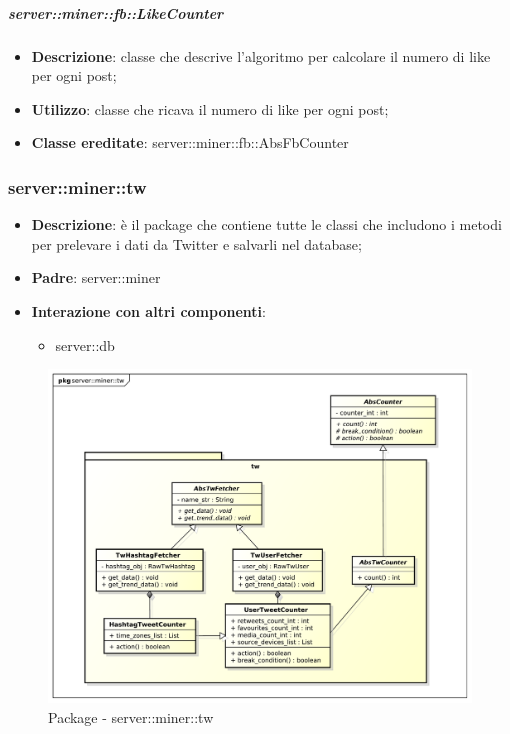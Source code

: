 	\subparagraph{server::miner::fb::LikeCounter} %
		\label{subp:server_miner_fb_LikeCounter}
			\begin{itemize}
				\item \textbf{Descrizione}: classe che descrive l'algoritmo per calcolare il numero di like per ogni post;
				\item \textbf{Utilizzo}: classe che ricava il numero di like per ogni post;
				\item \textbf{Classe ereditate}: server::miner::fb::AbsFbCounter
			\end{itemize}

\subsubsection{server::miner::tw} %
\label{ssub:bdsm_app_server_miner_tw}

\begin{itemize}
  \item \textbf{Descrizione}: è il package che contiene tutte le classi che includono i metodi per prelevare i dati da Twitter e salvarli nel database;
  \item \textbf{Padre}: server::miner
  \item \textbf{Interazione con altri componenti}:
  	\begin{itemize}
  		\item server::db
  	\end{itemize}
\end{itemize}

	\begin{figure}[!htbp]
		\centering
		\centerline{\includegraphics[scale=0.4]{./images/server/miner_tw.pdf}}
		\caption{Package - server::miner::tw}
	\end{figure}

